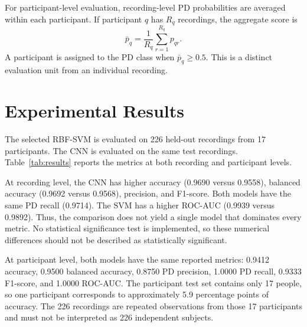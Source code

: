 \documentclass[11pt,a4paper]{article}
\begin{document}
For participant-level evaluation, recording-level PD probabilities are averaged within each participant. If participant $q$ has $R_q$ recordings, the aggregate score is
\begin{equation}
\bar{p}_q=\frac{1}{R_q}\sum_{r=1}^{R_q}p_{qr}.
\end{equation}
A participant is assigned to the PD class when $\bar{p}_q\geq0.5$. This is a distinct evaluation unit from an individual recording.

\section{Experimental Results}
The selected RBF-SVM is evaluated on 226 held-out recordings from 17 participants. The CNN is evaluated on the same test recordings. Table~\ref{tab:results} reports the metrics at both recording and participant levels.

\begin{table}[!htbp]
\centering
\caption{Held-out test performance for the two implemented models}
\label{tab:results}
\end{table}

At recording level, the CNN has higher accuracy (0.9690 versus 0.9558), balanced accuracy (0.9692 versus 0.9568), precision, and F1-score. Both models have the same PD recall (0.9714). The SVM has a higher ROC-AUC (0.9939 versus 0.9892). Thus, the comparison does not yield a single model that dominates every metric. No statistical significance test is implemented, so these numerical differences should not be described as statistically significant.

At participant level, both models have the same reported metrics: 0.9412 accuracy, 0.9500 balanced accuracy, 0.8750 PD precision, 1.0000 PD recall, 0.9333 F1-score, and 1.0000 ROC-AUC. The participant test set contains only 17 people, so one participant corresponds to approximately 5.9 percentage points of accuracy. The 226 recordings are repeated observations from those 17 participants and must not be interpreted as 226 independent subjects.
\end{document}
